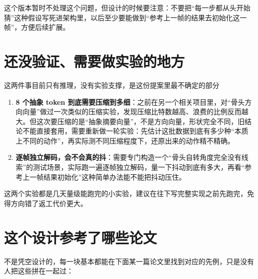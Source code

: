 \documentclass[11pt,a4paper]{ctexart}
\begin{document}
这个版本暂时不处理这个问题，但设计的时候要注意：不要把“每一步都从头开始猜”这种假设写死进架构里，以后至少要能做到“参考上一帧的结果去初始化这一帧”，方便后续扩展。

\section{还没验证、需要做实验的地方}

\begin{warnbox}{这两件事目前只有推理，没有实验支撑，是这份提案里最不确定的部分}
\begin{enumerate}
    \item \textbf{8 个抽象 token 到底需要压缩到多细}：之前在另一个相关项目里，对“骨头方向向量”做过一次类似的压缩实验，发现压缩比特数越高、浪费的比例反而越大。但这次要压缩的是“抽象摘要向量”，不是方向向量，形状完全不同，旧结论不能直接套用，需要重新做一轮实验：先估计这批数据到底有多少种“本质上不同的动作”，再实际测不同压缩程度下，还原出来的动作精不精确。
    \item \textbf{逐帧独立解码，会不会真的抖}：需要专门构造一个“骨头自转角度完全没有线索”的测试场景，实际跑一遍逐帧独立解码，量一下抖动到底有多大，再看“参考上一帧结果初始化”这种简单办法能不能把抖动压住。
\end{enumerate}
这两个实验都是几天量级能跑完的小实验，建议在往下写完整实现之前先跑完，免得方向错了返工代价更大。
\end{warnbox}

\section{这个设计参考了哪些论文}

不是凭空设计的，每一块基本都能在下面某一篇论文里找到对应的先例，只是没有人把这些拼在一起过：
\end{document}
